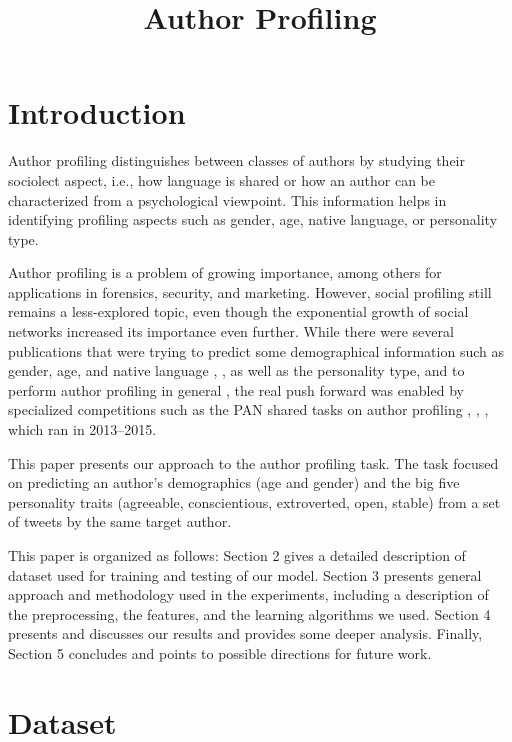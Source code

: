 \documentclass[10pt, a4paper]{article}
\title{ Author Profiling}
\begin{document}
\maketitleabstract

\section{Introduction}

Author profiling distinguishes between classes of authors by studying their sociolect aspect, i.e., how language is shared or how an author can be characterized from a psychological viewpoint. This information helps in identifying profiling aspects such as gender, age, native language, or personality type. 
\par
\vspace{1mm}
Author profiling is a problem of growing importance, among others for applications in forensics, security, and marketing. However, social profiling still remains a less-explored topic, even though the exponential growth of social networks increased its importance even further. While there were several publications that were trying to predict some demographical information such as gender, age, and native language \citep{argamon2003}, \citep{peersman2011}, as well as the personality type, and to perform author profiling in general \citep{argamon2009}, the real push forward was enabled by specialized competitions such as the PAN shared tasks on author profiling \citep{pardo2013}, \citep{rangel2014}, \citep{rangel2015}, which ran in 2013–2015. 
\par\vspace{1mm}
This paper presents our approach to the author profiling task. The task focused on predicting an author’s demographics (age and gender) and the big five personality traits \citep{mccrae2008} (agreeable, conscientious, extroverted, open, stable) from a set of tweets by the same target author.
\par\vspace{1mm}
This paper is organized as follows: Section 2
gives a detailed description of dataset used for
training and testing of our model. Section 3
presents general approach and methodology used
in the experiments, including a description of the
preprocessing, the features, and the learning
algorithms we used. Section 4 presents and
discusses our results and provides some deeper
analysis. Finally, Section 5 concludes and points
to possible directions for future work.

\section{Dataset}
\end{document}
